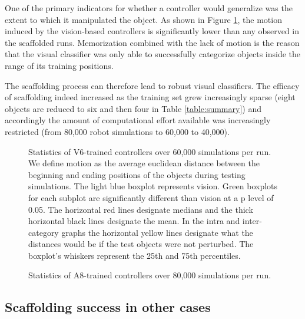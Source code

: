 \documentclass{sig-alternate}
\begin{document}
One of the primary indicators for whether a controller would generalize was the extent to which it manipulated the object. As shown in Figure \ref{fig:pv_V6_60}, the motion induced by the vision-based controllers is significantly lower than any observed in the scaffolded runs. Memorization combined with the lack of motion is the reason that the visual classifier was only able to successfully categorize objects inside the range of its training positions. 

The scaffolding process can therefore lead to robust visual classifiers. The efficacy of scaffolding indeed increased as the training set grew increasingly sparse (eight objects
are reduced to six and then four in Table \ref{table:summary}) and accordingly the amount of computational effort available was increasingly restricted (from 80,000 robot simulations to 60,000 to 40,000).

\begin{figure} [!t]
  \centering
  \vspace{-0.3cm} 
  \caption {Statistics of V6-trained controllers over 60,000 simulations per run. We define motion as the average euclidean distance between the beginning and ending positions of the objects during testing simulations. The light blue boxplot represents vision. Green boxplots for each subplot are significantly different than vision at a p level of 0.05. The horizontal red lines designate medians and the thick horizontal black lines designate the mean. In the intra and inter-category graphs the horizontal yellow lines designate what the distances would be if the test objects were not perturbed. The boxplot's whiskers represent the 25th and 75th percentiles.}
  \vspace{-0.6cm} 
  \label{fig:pv_V6_60}
\end {figure}

\begin{figure} [!t]
  \centering
  \vspace{-0.3cm} 
  \caption {Statistics of A8-trained controllers over 80,000 simulations per run.}
  \vspace{-0.5cm} 
  \label{fig:pv_A8_80}
\end {figure}

\subsection {Scaffolding success in other cases}
\end{document}
